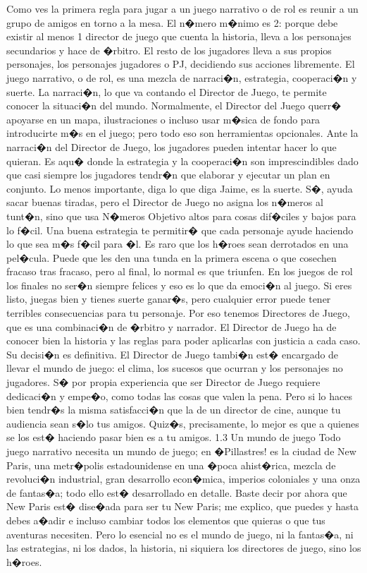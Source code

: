 Como ves la primera regla para jugar a un juego narrativo o de rol es reunir a un grupo de amigos en torno a la mesa. El n�mero m�nimo es 2: porque debe existir al menos 1 director de juego que cuenta la historia, lleva a los personajes secundarios y hace de �rbitro. El resto de los jugadores lleva a sus propios personajes, los personajes jugadores o PJ, decidiendo sus acciones libremente.
El juego narrativo, o de rol, es una mezcla de narraci�n, estrategia, cooperaci�n y suerte. La narraci�n, lo que va contando el Director de Juego, te permite conocer la situaci�n del mundo. Normalmente, el Director del Juego querr� apoyarse en un mapa, ilustraciones o incluso usar m�sica de fondo para introducirte m�s en el juego; pero todo eso son herramientas opcionales. Ante la narraci�n del Director de Juego, los jugadores pueden intentar hacer lo que quieran. Es aqu� donde la estrategia y la cooperaci�n son imprescindibles dado que casi siempre los jugadores tendr�n que elaborar y ejecutar un plan en conjunto. Lo menos importante, diga lo que diga Jaime, es la suerte. S�, ayuda sacar buenas tiradas, pero el Director de Juego no asigna los n�meros al tunt�n, sino que usa N�meros Objetivo altos para cosas dif�ciles y bajos para lo f�cil. Una buena estrategia te permitir� que cada personaje ayude haciendo lo que sea m�s f�cil para �l.
Es raro que los h�roes sean derrotados en una pel�cula. Puede que les den una tunda en la primera escena o que cosechen fracaso tras fracaso, pero al final, lo normal es que triunfen. En los juegos de rol los finales no ser�n siempre felices y eso es lo que da emoci�n al juego. Si eres listo, juegas bien y tienes suerte ganar�s, pero cualquier error puede tener terribles consecuencias para tu personaje.
Por eso tenemos Directores de Juego, que es una combinaci�n de �rbitro y narrador. El Director de Juego ha de conocer bien la historia y las reglas para poder aplicarlas con justicia a cada caso. Su decisi�n es definitiva. El Director de Juego tambi�n est� encargado de llevar el mundo de juego: el clima, los sucesos que ocurran y los personajes no jugadores.
S� por propia experiencia que ser Director de Juego requiere dedicaci�n y empe�o, como todas las cosas que valen la pena. Pero si lo haces bien tendr�s la misma satisfacci�n que la de un director de cine, aunque tu audiencia sean s�lo tus amigos.
Quiz�s, precisamente, lo mejor es que a quienes se los est� haciendo pasar bien es a tu amigos.
1.3 Un mundo de juego
Todo juego narrativo necesita un mundo de juego; en �Pillastres! es la ciudad de New Paris, una metr�polis estadounidense en una �poca ahist�rica, mezcla de revoluci�n industrial, gran desarrollo econ�mica, imperios coloniales y una onza de fantas�a; todo ello est� desarrollado en detalle. Baste decir por ahora que New Paris est� dise�ada para ser tu New Paris; me explico, que puedes y hasta debes a�adir e incluso cambiar todos los elementos que quieras o que tus aventuras necesiten. 
Pero lo esencial no es el mundo de juego, ni la fantas�a, ni las estrategias, ni los dados, la historia, ni siquiera los directores de juego, sino los h�roes.


